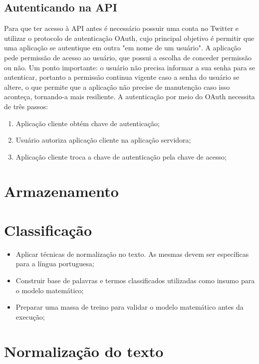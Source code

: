 \subsection{Autenticando na API}

Para que ter acesso à API antes é necessário possuir uma conta no Twitter e utilizar o protocolo de autenticação OAuth\cite{oauth}, cujo principal objetivo é permitir que uma aplicação se autentique em outra "em nome de um usuário". A aplicação pede permissão de acesso ao usuário, que possui a escolha de conceder permissão ou não. Um ponto importante: o usuário não precisa informar a sua senha para se autenticar, portanto a permissão continua vigente caso a senha do usuário se altere, o que permite que a aplicação não precise de manutenção caso isso aconteça, tornando-a mais resiliente. A autenticação por meio do OAuth necessita de três passos:

\begin{enumerate}
	\item Aplicação cliente obtém chave de autenticação;
	\item Usuário autoriza aplicação cliente na aplicação servidora;
	\item Aplicação cliente troca a chave de autenticação pela chave de acesso;
\end{enumerate}


\section{Armazenamento}


\section{Classificação}
\begin{itemize}
	\item Aplicar técnicas de normalização no texto. As mesmas devem ser específicas para a língua portuguesa;
	\item Construir base de palavras e termos classificados utilizadas como insumo para o modelo matemático;
	\item Preparar uma massa de treino para validar o modelo matemático antes da execução;
\end{itemize}

\section{Normalização do texto}

